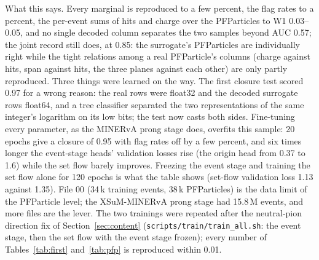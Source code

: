 \documentclass[10pt,letterpaper]{article}
\newcommand{\code}[1]{\texttt{#1}}
\begin{document}
What this says. Every marginal is reproduced to a few percent, the flag rates to a percent, the per-event sums of
hits and charge over the PFParticles to W1 0.03--0.05, and no single decoded column separates the two samples beyond
AUC 0.57; the joint record still does, at 0.85: the surrogate's PFParticles are individually
right while the tight relations among a real PFParticle's columns (charge against hits, span against hits, the three
planes against each other) are only partly reproduced. Three things were learned on the way. The first closure test
scored 0.97 for a wrong reason: the real rows were float32 and the decoded surrogate rows float64, and a tree
classifier separated the two representations of the same integer's logarithm on its low bits; the test now casts both
sides. Fine-tuning every parameter, as the MINERvA prong stage does, overfits this sample: 20 epochs give a closure of
0.95 with flag rates off by a few percent, and six times longer the event-stage heads' validation losses rise (the origin
head from 0.37 to 1.6) while the set flow barely improves. Freezing the event stage and training the set flow alone
for 120 epochs is what the table shows (set-flow validation loss 1.13 against 1.35). File 00 (34\,k training events,
38\,k PFParticles) is the data limit of the PFParticle level; the XSuM-MINERvA prong stage had 15.8\,M events, and
more files are the lever. The two trainings were repeated after the neutral-pion direction fix of
Section~\ref{sec:content} (\code{scripts/train/train\_all.sh}: the event stage, then the set flow with the event
stage frozen); every number of Tables~\ref{tab:first} and~\ref{tab:pfp} is reproduced within 0.01.
\end{document}
